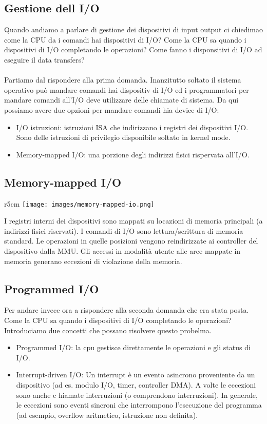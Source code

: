 \subsection{Gestione dell I/O}
Quando andiamo a parlare di gestione dei dispositivi di input output ci chiedimao come la CPU da i comandi 
hai dispositivi di I/O? Come la CPU sa quando i dispositivi di I/O completando le operazioni? Come fanno i 
disponsitivi di I/O ad eseguire il data transfers?\\\\
Partiamo dal rispondere alla prima domanda. Inanzitutto soltato il sistema operativo può mandare comandi hai dispositiv
di I/O ed i programmatori per mandare comandi all'I/O deve utilizzare delle chiamate di sistema. Da qui possiamo avere
due opzioni per mandare comandi hia device di I/O:
\begin{itemize}
    \item I/O istruzioni: istruzioni ISA che indirizzano i registri dei dispositivi I/O. Sono delle istruzioni di privilegio disponibile soltato in kernel mode.
    \item Memory-mapped I/O: una porzione degli indirizzi fisici rispervata all'I/O.
\end{itemize}

\subsection{Memory-mapped I/O}
\begin{wrapfigure}{r}{5cm}
    \vspace{-30pt}
    \centering
    \texttt{[image: images/memory-mapped-io.png]}
\end{wrapfigure}
I registri interni dei dispositivi sono mappati su locazioni di memoria principali (a indirizzi fisici riservati). 
I comandi di I/O sono lettura/scrittura di memoria standard. Le operazioni in quelle posizioni vengono reindirizzate ai controller del dispositivo dalla MMU. 
Gli accessi in modalità utente alle aree mappate in memoria generano eccezioni di violazione della memoria.

\subsection{Programmed I/O}
Per andare invece ora a rispondere alla seconda domanda che era stata posta. Come la CPU sa quando i dispositivi di I/O completando le operazioni?
Introduciamo due concetti che possano risolvere questo probelma.
\begin{itemize}
    \item Programmed I/O: la cpu gestisce direttamente le operazioni e gli status di I/O.
    \item Interrupt-driven I/O: Un interrupt è un evento asincrono proveniente da un dispositivo (ad es. modulo I/O, timer, controller DMA). A volte le eccezioni sono anche c
    hiamate interruzioni (o comprendono interruzioni). In generale, le eccezioni sono eventi sincroni che interrompono l'esecuzione del programma (ad esempio, overflow aritmetico, istruzione non definita).
\end{itemize}

